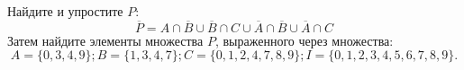 \question
Найдите и упростите $P$:
\begin{equation*}
\overline{P} = A \cap \overline{B} \cup \overline{B} \cap C \cup \overline{A} \cap \overline{B} \cup \overline{A} \cap C
\end{equation*}
Затем найдите элементы множества $P$, выраженного через множества:
\begin{equation*}
	A = \{0, 3, 4, 9\}; 
	B = \{1, 3, 4, 7\};
	C = \{0, 1, 2, 4, 7, 8, 9\};
	I = \{0, 1, 2, 3, 4, 5, 6, 7, 8, 9\}.
\end{equation*}